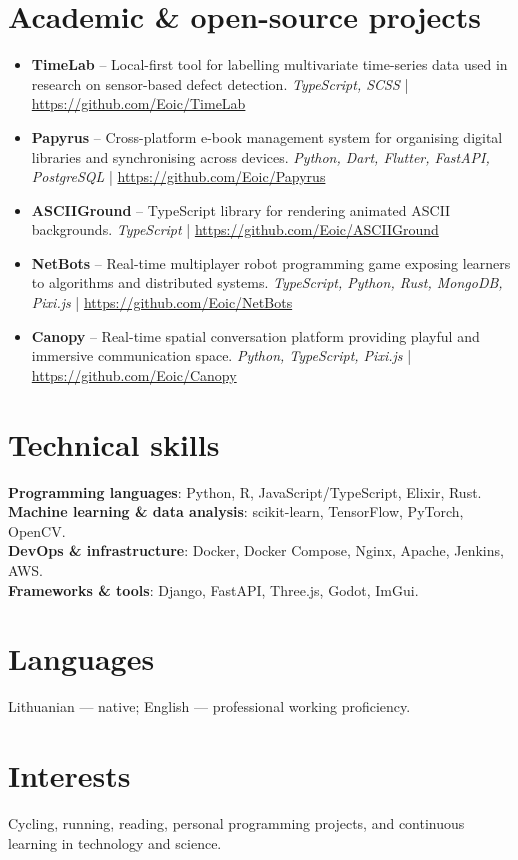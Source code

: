 \documentclass[10pt,a4paper]{article}
\newcommand{\techstack}[1]{\textcolor{black!70}{\small\textit{#1}}}
\begin{document}
\section*{Academic \& open-source projects}
\begin{itemize}[leftmargin=*, topsep=0em]
  \item \textbf{TimeLab} -- Local-first tool for labelling multivariate time-series data used in research on sensor-based defect detection. \techstack{TypeScript, SCSS} | \url{https://github.com/Eoic/TimeLab}
  \item \textbf{Papyrus} -- Cross-platform e-book management system for organising digital libraries and synchronising across devices. \techstack{Python, Dart, Flutter, FastAPI, PostgreSQL} | \url{https://github.com/Eoic/Papyrus}
  \item \textbf{ASCIIGround} -- TypeScript library for rendering animated ASCII backgrounds. \techstack{TypeScript} | \url{https://github.com/Eoic/ASCIIGround}
  \item \textbf{NetBots} -- Real-time multiplayer robot programming game exposing learners to algorithms and distributed systems. \techstack{TypeScript, Python, Rust, MongoDB, Pixi.js} | \url{https://github.com/Eoic/NetBots}
  \item \textbf{Canopy} -- Real-time spatial conversation platform providing playful and immersive communication space. \techstack{Python, TypeScript, Pixi.js} | \url{https://github.com/Eoic/Canopy}
\end{itemize}

\section*{Technical skills}
\textbf{Programming languages}: Python, R, JavaScript/TypeScript, Elixir, Rust.\\
\textbf{Machine learning \& data analysis}: scikit-learn, TensorFlow, PyTorch, OpenCV.\\
\textbf{DevOps \& infrastructure}: Docker, Docker Compose, Nginx, Apache, Jenkins, AWS.\\
\textbf{Frameworks \& tools}: Django, FastAPI, Three.js, Godot, ImGui.

\section*{Languages}
Lithuanian — native; English — professional working proficiency.

\section*{Interests}
Cycling, running, reading, personal programming projects, and continuous learning in technology and science.

\endgroup
\end{document}
